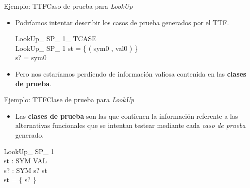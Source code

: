 \documentclass[pdf]{beamer}
\begin{document}
\begin{frame}{Ejemplo: TTF}{Caso de prueba para \emph{LookUp}}

  \begin{itemize}
    \item{
      Podríamos intentar describir los casos de prueba generados por el TTF. \\
      \vspace{-.5cm}
      \begin{schema}{LookUp\_ SP\_ 1\_ TCASE}\\
        LookUp\_ SP\_ 1 
        \where
        st = \{ ( sym0 , val0 ) \} \\
        s? = sym0
      \end{schema}
    }
    
    \vspace{-.5cm}
    \item Pero nos estaríamos perdiendo de información valiosa contenida en las \textbf{clases de prueba}.
  \end{itemize}
\end{frame}
                                
\begin{frame}{Ejemplo: TTF}{Clase de prueba para \emph{LookUp}}
  \begin{itemize}
    \item{
      Las \textbf{clases de prueba} son las que contienen la información referente a las alternativas funcionales que se intentan testear mediante cada \emph{caso de prueba} generado.\\
      
    }
                                               
  \end{itemize}
  
  \vspace{-0.8cm}
  \begin{schema}{LookUp\_ SP\_ 1}\\
    st : SYM \pfun VAL \\
    s? : SYM 
    \where
    s? \in \dom st \\
    \dom st = \{ s? \}
  \end{schema}
\end{frame}
                                      
\end{document}

